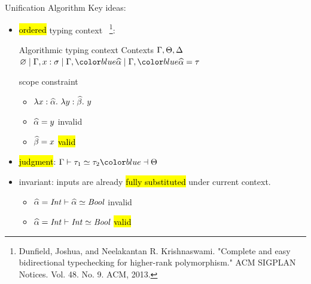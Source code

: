 \documentclass{beamer}
\begin{document}
\begin{frame}{Unification Algorithm}
  Key ideas:
  \begin{itemize}
  \item \hl{ordered} typing context
    ~\footnote{Dunfield, Joshua, and Neelakantan R. Krishnaswami. "Complete and
      easy bidirectional typechecking for higher-rank polymorphism." ACM SIGPLAN
      Notices. Vol. 48. No. 9. ACM, 2013.}:
    \begin{block}{Algorithmic typing context}
      Contexts
      $\Gamma, \Theta, \Delta$  \syndef $\ctxinit \mid \tctx,x:\sigma
      \mid \tctx, \hl{\genA}
      \mid \tctx, \hl{\genA = \tau} $
    \end{block}
    scope constraint
    \begin{itemize}
      \item $\lambda x:\widehat{\alpha}.~ {\lambda y:\widehat{\beta}.~} y$
      \item $\widehat{\alpha} = y$ \alert{invalid}
      \item $\widehat{\beta} = x$ \hl{valid}
    \end{itemize}
  \item<2-> \hl{judgment}: $\tctx \byuni \tau_1 \uni \tau_2 \hl{\toctx}$
  \item<3-> invariant: inputs are already \hl{fully substituted} under current context.
    \begin{itemize}
      \item $\widehat{\alpha} = \mathit{Int} \vdash \widehat{\alpha} \simeq \mathit{Bool}$ \alert{invalid}
      \item $\widehat{\alpha} = \mathit{Int} \vdash \mathit{Int} \simeq \mathit{Bool}$ \hl{valid}
    \end{itemize}
  \end{itemize}
\end{frame}
\end{document}
